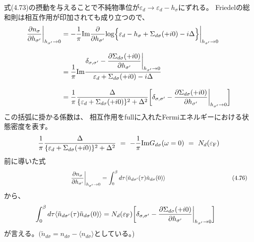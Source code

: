 \documentclass[a4j]{jarticle}
\begin{document}
式(4.73)の摂動を与えることで不純物準位が$\varepsilon_{d} \to \varepsilon_{d} - h_{\sigma}$にずれる。
Friedelの総和則は相互作用が印加されても成り立つので、
\begin{align}
	\frac{\partial n_{\sigma}}{\partial h_{\sigma'}}
	\bigg|_{h_{\sigma'} \to 0}
	 & =
	- \frac{1}{\pi}
	{\rm Im}
	\frac{\partial }{\partial h_{\sigma'}}
	{\rm log}
	\Big\{
	\varepsilon_{d}
	-
	h_{\sigma}
	+
	\Sigma_{d\sigma}(+i 0)
	-
	i \Delta
	\Big\}
	\bigg|_{h_{\sigma'} \to 0}
	\nonumber \\[3mm] &=
	\frac{1}{\pi}
	{\rm Im}
	\frac{
		\delta_{\sigma,\sigma'}
		-
		\dfrac{\partial \Sigma_{d \sigma}(+i0)}{\partial h_{\sigma'}}
		\bigg|_{h_{\sigma'} \to 0}
	}
	{
		\varepsilon_{d}
		+
		\Sigma_{d\sigma}(+i 0)
		-
		i \Delta
	}
	\nonumber \\[3mm] &=
	\frac{1}{\pi}
	\frac{
		\Delta
	}
	{
		\{
		\varepsilon_{d}
		+
		\Sigma_{d\sigma}(+i 0)
		\}^{2}
		+
		\Delta^{2}
	}
	\bigg[
		\delta_{\sigma,\sigma'}
		-
		\dfrac{\partial \Sigma_{d \sigma}(+i0)}{\partial h_{\sigma'}}
		\bigg|_{h_{\sigma'} \to 0}
		\bigg]
\end{align}
この括弧に掛かる係数は、
相互作用をfullに入れたFermiエネルギーにおける状態密度を表す。
\begin{align}
	\frac{1}{\pi}
	\frac{
		\Delta
	}
	{
		\{
		\varepsilon_{d}
		+
		\Sigma_{d\sigma}(+i 0)
		\}^{2}
		+
		\Delta^{2}
	}
	\ = \
	-
	\frac{1}{\pi}
	{\rm Im}G_{d \sigma}(\omega=0)
	\ = \
	N_{d}(\varepsilon_{\rm F})
\end{align}
前に導いた式
\begin{align}
	\hspace{39.4mm}
	\frac{
		\partial
		n_{\sigma}
	}{
		\partial
		h_{\sigma'}
	}
	\bigg|_{h_{\sigma'} \to 0}
	 & =
	\int^{\beta}_{0}d \tau
	\langle
	\tilde{n}_{d \sigma'}(\tau)
	\tilde{n}_{d \sigma}(0)
	\rangle
	\nonumber
	\hspace{39.4mm}
	(4.76)
\end{align}
から、
\begin{align}
	\int^{\beta}_{0}d \tau
	\langle
	\tilde{n}_{d \sigma'}(\tau)
	\tilde{n}_{d \sigma}(0)
	\rangle
	 & =
	N_{d}(\varepsilon_{\rm F})
	\bigg[
		\delta_{\sigma,\sigma'}
		-
		\dfrac{\partial \Sigma_{d \sigma}(+i0)}{\partial h_{\sigma'}}
		\bigg|_{h_{\sigma'} \to 0}
		\bigg]
\end{align}
が言える。$( \tilde{n}_{d \sigma} = n_{d \sigma} - \langle n_{d \sigma} \rangle $としている。)

${}$
\end{document}
